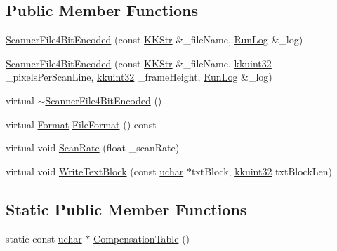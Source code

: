 \subsection*{Public Member Functions}
\begin{DoxyCompactItemize}
\item 
\hyperlink{class_k_k_l_s_c_1_1_scanner_file4_bit_encoded_af5ba0fa1c0f147f7ecd61c46e904f4c1}{Scanner\+File4\+Bit\+Encoded} (const \hyperlink{class_k_k_b_1_1_k_k_str}{K\+K\+Str} \&\+\_\+file\+Name, \hyperlink{class_k_k_b_1_1_run_log}{Run\+Log} \&\+\_\+log)
\item 
\hyperlink{class_k_k_l_s_c_1_1_scanner_file4_bit_encoded_a344b2ba0088563600248b56725954703}{Scanner\+File4\+Bit\+Encoded} (const \hyperlink{class_k_k_b_1_1_k_k_str}{K\+K\+Str} \&\+\_\+file\+Name, \hyperlink{namespace_k_k_b_af8d832f05c54994a1cce25bd5743e19a}{kkuint32} \+\_\+pixels\+Per\+Scan\+Line, \hyperlink{namespace_k_k_b_af8d832f05c54994a1cce25bd5743e19a}{kkuint32} \+\_\+frame\+Height, \hyperlink{class_k_k_b_1_1_run_log}{Run\+Log} \&\+\_\+log)
\item 
virtual \hyperlink{class_k_k_l_s_c_1_1_scanner_file4_bit_encoded_a7587766154916938197a20e706dd8a39}{$\sim$\+Scanner\+File4\+Bit\+Encoded} ()
\item 
virtual \hyperlink{class_k_k_l_s_c_1_1_scanner_file_a9eb976c9d084a94db71a5e8d1fadb903}{Format} \hyperlink{class_k_k_l_s_c_1_1_scanner_file4_bit_encoded_a44455f93346c6ee7fb6e3a58aa2b8476}{File\+Format} () const 
\item 
virtual void \hyperlink{class_k_k_l_s_c_1_1_scanner_file4_bit_encoded_a2bf7f03ff2280785b5e91ae86682a7e5}{Scan\+Rate} (float \+\_\+scan\+Rate)
\item 
virtual void \hyperlink{class_k_k_l_s_c_1_1_scanner_file4_bit_encoded_af0c1425659864e9a391792c16763357e}{Write\+Text\+Block} (const \hyperlink{namespace_k_k_b_ace9969169bf514f9ee6185186949cdf7}{uchar} $\ast$txt\+Block, \hyperlink{namespace_k_k_b_af8d832f05c54994a1cce25bd5743e19a}{kkuint32} txt\+Block\+Len)
\end{DoxyCompactItemize}
\subsection*{Static Public Member Functions}
\begin{DoxyCompactItemize}
\item 
static const \hyperlink{namespace_k_k_b_ace9969169bf514f9ee6185186949cdf7}{uchar} $\ast$ \hyperlink{class_k_k_l_s_c_1_1_scanner_file4_bit_encoded_a9e4c61f8878da6a504ad21770a0190f8}{Compensation\+Table} ()
\end{DoxyCompactItemize}
